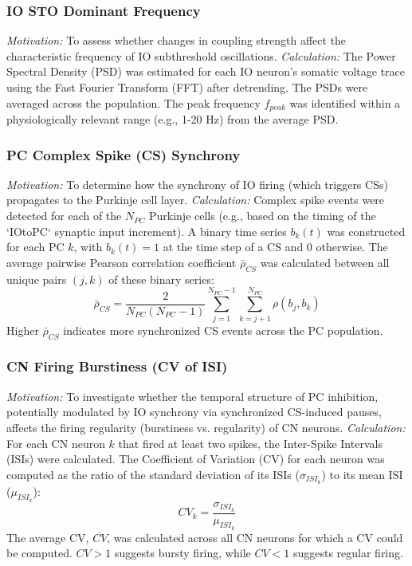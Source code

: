 \documentclass{article}
\begin{document}
{\subsubsection{IO STO Dominant Frequency}
\textit{Motivation:} To assess whether changes in coupling strength affect the characteristic frequency of IO subthreshold oscillations.
\textit{Calculation:} The Power Spectral Density (PSD) was estimated for each IO neuron's somatic voltage trace using the Fast Fourier Transform (FFT) after detrending. The PSDs were averaged across the population. The peak frequency \( f_{peak} \) was identified within a physiologically relevant range (e.g., 1-20 Hz) from the average PSD.

\subsubsection{PC Complex Spike (CS) Synchrony}
\textit{Motivation:} To determine how the synchrony of IO firing (which triggers CSs) propagates to the Purkinje cell layer.
\textit{Calculation:} Complex spike events were detected for each of the \( N_{PC} \) Purkinje cells (e.g., based on the timing of the `IOtoPC` synaptic input increment). A binary time series \( b_k(t) \) was constructed for each PC \( k \), with \( b_k(t) = 1 \) at the time step of a CS and 0 otherwise. The average pairwise Pearson correlation coefficient \( \bar{\rho}_{CS} \) was calculated between all unique pairs \( (j, k) \) of these binary series:
\begin{equation}
\bar{\rho}_{CS} = \frac{2}{N_{PC}(N_{PC}-1)} \sum_{j=1}^{N_{PC}-1} \sum_{k=j+1}^{N_{PC}} \rho(b_j, b_k)
\end{equation}
Higher \( \bar{\rho}_{CS} \) indicates more synchronized CS events across the PC population.

\subsubsection{CN Firing Burstiness (CV of ISI)}
\textit{Motivation:} To investigate whether the temporal structure of PC inhibition, potentially modulated by IO synchrony via synchronized CS-induced pauses, affects the firing regularity (burstiness vs. regularity) of CN neurons.
\textit{Calculation:} For each CN neuron \( k \) that fired at least two spikes, the Inter-Spike Intervals (ISIs) were calculated. The Coefficient of Variation (CV) for each neuron was computed as the ratio of the standard deviation of its ISIs (\( \sigma_{ISI_k} \)) to its mean ISI (\( \mu_{ISI_k} \)):
\begin{equation}
CV_{k} = \frac{\sigma_{ISI_k}}{\mu_{ISI_k}}
\end{equation}
The average CV, \( \overline{CV} \), was calculated across all CN neurons for which a CV could be computed. \( CV > 1 \) suggests bursty firing, while \( CV < 1 \) suggests regular firing.

}
\end{document}
